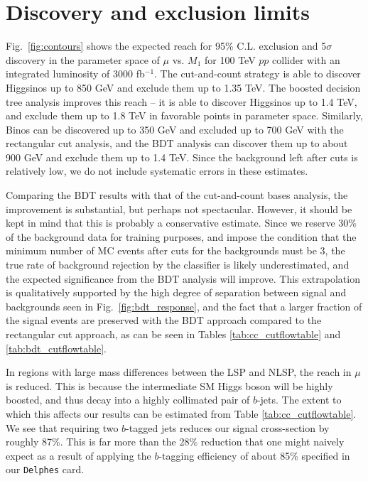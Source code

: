 \documentclass[a4paper,11pt]{article}
\begin{document}
\section{Discovery and exclusion limits}
\label{sec:results}

Fig.~\ref{fig:contours} shows the expected reach  for 95\% C.L. exclusion and
5$\sigma$ discovery in the parameter space of $\mu$ vs.  $M_1$ for 100 TeV $pp$
collider with an integrated luminosity of 3000 fb$^{-1}$. The cut-and-count
strategy is able to discover Higgsinos up to 850 GeV  and exclude them up to
1.35 TeV.  The boosted decision
tree analysis improves this reach -- it is able to discover Higgsinos up to
1.4 TeV, and exclude them up to 1.8 TeV in favorable points in parameter space.
Similarly, Binos can be discovered up to 350 GeV and excluded up to 700 GeV
with the rectangular cut analysis, and the BDT analysis can discover them up to
about 900 GeV and exclude them up to 1.4 TeV. Since the background left after
cuts is relatively low, we do not include systematic errors in these estimates.  


Comparing the BDT results with that of the cut-and-count bases analysis, the improvement is substantial, but perhaps not spectacular. However, it should
be kept in mind that this is probably a conservative estimate. Since we reserve
30\% of the background data for training purposes, and impose the condition that the
minimum number of MC events after cuts for the backgrounds must be 3, the true rate of background
rejection by the classifier is likely underestimated, and the expected
significance from the BDT analysis will improve. This extrapolation is
qualitatively supported by the high degree of separation between signal and
backgrounds seen in Fig.~\ref{fig:bdt_response}, and the fact that a larger
fraction of the signal events are preserved with the BDT approach compared to
the rectangular cut approach, as can be seen in Tables \ref{tab:cc_cutflowtable}
and \ref{tab:bdt_cutflowtable}.  

In regions with large mass differences between the LSP and NLSP, the reach in $\mu$ is
reduced.  This is because the intermediate SM Higgs boson will be highly boosted, and
thus decay into a highly collimated pair of $b$-jets. The extent to which this
affects our results can be estimated from Table \ref{tab:cc_cutflowtable}. We
see that requiring two $b$-tagged jets reduces our signal cross-section by
roughly 87\%. This is far more than the 28\% reduction that one might naively
expect as a result of applying the $b$-tagging efficiency of about 85\%
specified in our \texttt{Delphes} card.  
 
\end{document}

